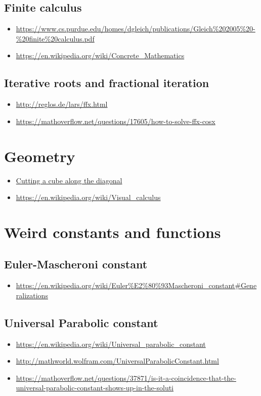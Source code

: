\subsection{Finite calculus}
\begin{itemize}
\item \url{https://www.cs.purdue.edu/homes/dgleich/publications/Gleich\%202005\%20-\%20finite\%20calculus.pdf}
\item \url{https://en.wikipedia.org/wiki/Concrete_Mathematics}
\end{itemize}

\subsection{Iterative roots and fractional iteration}
\begin{itemize}
\item \url{http://reglos.de/lars/ffx.html}
\item \url{https://mathoverflow.net/questions/17605/how-to-solve-ffx-cosx}
\end{itemize}

\section{Geometry}
\begin{itemize}
\item \href{https://www.friedrich-verlag.de/fileadmin/redaktion/sekundarstufe/Mathematik/Der_Mathematikunterricht/Leseproben/Der_Mathematikunterricht_3_13_Leseprobe_2.pdf}{Cutting a cube along the diagonal}
\item \url{https://en.wikipedia.org/wiki/Visual_calculus}
\end{itemize}

\section{Weird constants and functions}

\subsection{Euler-Mascheroni constant}
\begin{itemize}
\item \url{https://en.wikipedia.org/wiki/Euler\%E2\%80\%93Mascheroni_constant#Generalizations}
\end{itemize}

\subsection{Universal Parabolic constant}
\begin{itemize}
\item \url{https://en.wikipedia.org/wiki/Universal_parabolic_constant}
\item \url{http://mathworld.wolfram.com/UniversalParabolicConstant.html}
\item \url{https://mathoverflow.net/questions/37871/is-it-a-coincidence-that-the-universal-parabolic-constant-shows-up-in-the-soluti}
\end{itemize}

